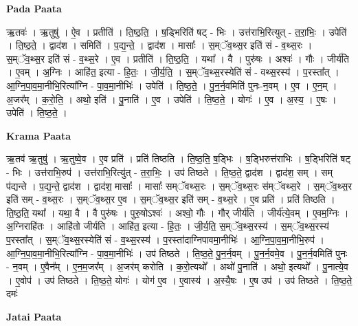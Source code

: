 \documentclass[17pt]{extarticle}
\begin{document}
\textbf{Pada Paata} \newline

ऋ॒तवः॑ । ऋ॒तुषु॑ । ऐ॒व । प्रतीति॑ । ति॒ष्ठ॒ति॒ । ष॒ड्भिरिति॑ षट् - भिः । उत्त॑राभि॒रित्युत् - त॒रा॒भिः॒ । उपेति॑ । ति॒ष्ठ॒ते॒ । द्वाद॑श । समिति॑ । प॒द्य॒न्ते॒ । द्वाद॑श । मासाः᳚ । स॒म्ॅव॒थ्स॒र इति॑ सं - व॒थ्स॒रः । स॒म्ॅव॒थ्स॒र इति॑ सं - व॒थ्स॒रे । ए॒व । प्रतीति॑ । ति॒ष्ठ॒ति॒ । यथा᳚ । वै । पुरु॑षः । अश्वः॑ । गौः । जीर्य॑ति । ए॒वम् । अ॒ग्निः । आहि॑त॒ इत्या - हि॒तः॒ । जी॒र्य॒ति॒ । स॒॒म्ॅव॒थ्स॒रस्येति॑ सं - वथ्स॒रस्य॑ । प॒रस्ता᳚त् । आ॒ग्नि॒पा॒व॒मा॒नीभि॒रित्या᳚ग्नि - पा॒व॒मा॒नीभिः॑ । उपेति॑ । ति॒ष्ठ॒ते॒ । पु॒न॒र्न॒वमिति॑ पुनः-न॒वम् । ए॒व । ए॒न॒म् । अ॒जर᳚म् । क॒रो॒ति॒ । अथो॒ इति॑ । पु॒नाति॑ । ए॒व । उपेति॑ । ति॒ष्ठ॒ते॒ । योगः॑ । ए॒व । अ॒स्य॒ । ए॒षः । उपेति॑ । ति॒ष्ठ॒ते॒ ।  \newline


\textbf{Krama Paata} \newline

ऋ॒तव॑ ऋ॒तुषु॑ । ऋ॒तुष्वे॒व । ए॒व प्रति॑ । प्रति॑ तिष्ठति । ति॒ष्ठ॒ति॒ ष॒ड्भिः । ष॒ड्भिरुत्त॑राभिः । ष॒ड्भिरिति॑ षट् - भिः । उत्त॑राभि॒रुप॑ । उत्त॑राभि॒रित्यु॑त् - त॒रा॒भिः॒ । उप॑ तिष्ठते । ति॒ष्ठ॒ते॒ द्वाद॑श । द्वाद॑श॒ सम् । सम् प॑द्यन्ते । प॒द्य॒न्ते॒ द्वाद॑श । द्वाद॑श॒ मासाः᳚ । मासाः᳚ सम्ॅवथ्स॒रः । स॒म्ॅव॒थ्स॒रः स॑म्ॅवथ्स॒रे । स॒म्ॅव॒थ्स॒र इति॑ सम् - व॒थ्स॒रः । स॒म्ॅव॒थ्स॒र ए॒व । स॒म्ॅव॒थ्स॒र इति॑ सम् - व॒थ्स॒रे । ए॒व प्रति॑ । प्रति॑ तिष्ठति । ति॒ष्ठ॒ति॒ यथा᳚ । यथा॒ वै । वै पुरु॑षः । पुरु॒षोऽश्वः॑ । अश्वो॒ गौः । गौर् जीर्य॑ति । जीर्य॑त्ये॒वम् । ए॒वम॒ग्निः । अ॒ग्निराहि॑तः । आहि॑तो जीर्यति । आहि॑त॒ इत्या - हि॒तः॒ । जी॒र्य॒ति॒ स॒म्ॅव॒थ्स॒रस्य॑ । स॒म्ॅव॒थ्स॒रस्य॑ प॒रस्ता᳚त् । स॒म्ॅव॒थ्स॒रस्येति॑ सं - व॒थ्स॒रस्य॑ । प॒रस्ता॑दाग्निपावमा॒नीभिः॑ । आ॒ग्नि॒पा॒व॒मा॒नीभि॒रुप॑ । आ॒ग्नि॒पा॒व॒मा॒नीभि॒रित्या᳚ग्नि - पा॒व॒मा॒नीभिः॑ । उप॑ तिष्ठते । ति॒ष्ठ॒ते॒ पु॒न॒र्न॒वम् । पु॒न॒र्न॒वमे॒व । पु॒न॒र्न॒वमिति॑ पुनः - न॒वम् । ए॒वैन᳚म् । ए॒न॒म॒जर᳚म् । अ॒जर॑म् करोति । क॒रो॒त्यथो᳚ । अथो॑ पु॒नाति॑ । अथो॒ इत्यथो᳚ । पु॒नात्ये॒व । ए॒वोप॑ । उप॑ तिष्ठते । ति॒ष्ठ॒ते॒ योगः॑ । योग॑ ए॒व । ए॒वास्य॑ । अ॒स्यै॒षः । ए॒ष उप॑ । उप॑ तिष्ठते । ति॒ष्ठ॒ते॒ दमः॑ \newline

\textbf{Jatai Paata} \newline
\end{document}
